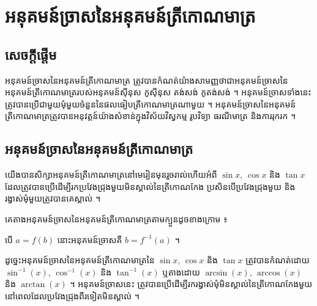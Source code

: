 \chapter{អនុគមន៍ច្រាសនៃអនុគមន៍ត្រីកោណមាត្រ}

\section{សេចក្តីផ្តើម}

អនុគមន៍ច្រាសនៃអនុគមន៍ត្រីកោណមាត្រ ត្រូវបានកំណត់យ៉ាងសាមញ្ញថាជាអនុគមន៍ច្រាសនៃអនុគមន៍ត្រីកោណមាត្ររបស់អនុគមន៍ស៊ីនុស កូស៊ីនុស តង់សង់ កូតង់សង់ ។ អនុគមន៍ច្រាសទាំងនេះត្រូវបានប្រើជាមួយមុំមួយចំនួននៃផលធៀបត្រីកោណមាត្រណាមួយ ។ អនុគមន៍ច្រាសនៃអនុគមន៍ត្រីកោណមាត្រត្រូវបានអនុវត្តន៍យ៉ាងសំខាន់ក្នុងវិស័យវិស្វកម្ម រូបវិទ្យា ធរណីមាត្រ និងការរុករក ។

\section{អនុគមន៍ច្រាសនៃអនុគមន៍ត្រីកោណមាត្រ}

យើងបានសិក្សាអនុគមន៍ត្រីកោណមាត្រនៅមេរៀនមុនរួចរាល់ហើយអំពី $\sin x$, $\cos x$ និង $\tan x$ ដែលត្រូវបានប្រើដើម្បីរកប្រវែងជ្រុងមួយមិនស្គាល់នៃត្រីកោណកែង ប្រសិនបើប្រវែងជ្រុងមួយ និងរង្វាស់មុំមួយត្រូវបានគេស្គាល់ ។

គេតាងអនុគមន៍ច្រាសនៃអនុគមន៍ត្រីកោណមាត្រតាមក្បួនដូចខាងក្រោម ៖
\begin{formulaBox}[និយមន័យ]
បើ $a = f(b)$ នោះអនុគមន៍ច្រាសគឺ $b = f^{-1}(a)$ ។
\end{formulaBox}

ដូច្នេះអនុគមន៍ច្រាសនៃអនុគមន៍ត្រីកោណមាត្រនៃ $\sin x$, $\cos x$ និង $\tan x$ ត្រូវបានកំណត់ដោយ $\sin^{-1}(x)$, $\cos^{-1}(x)$ និង $\tan^{-1}(x)$ ឬតាងដោយ $\arcsin(x)$, $\arccos(x)$ និង $\arctan(x)$ ។ អនុគមន៍ច្រាសនេះ ត្រូវបានប្រើដើម្បីរករង្វាស់មុំមិនស្គាល់នៃត្រីកោណកែងមួយ នៅពេលដែលប្រវែងជ្រុងពីរទៀតមិនស្គាល់ ។

